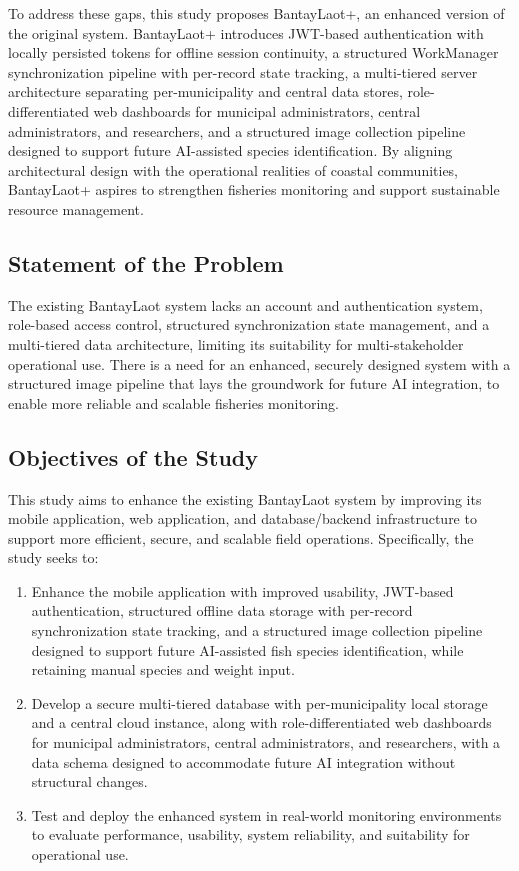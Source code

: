 \documentclass{icsthesis}
\begin{document}
\begin{mainmatter}
To address these gaps, this study proposes BantayLaot+, an enhanced version of the original system. BantayLaot+ introduces JWT-based authentication with locally persisted tokens for offline session continuity, a structured WorkManager synchronization pipeline with per-record state tracking, a multi-tiered server architecture separating per-municipality and central data stores, role-differentiated web dashboards for municipal administrators, central administrators, and researchers, and a structured image collection pipeline designed to support future AI-assisted species identification. By aligning architectural design with the operational realities of coastal communities, BantayLaot+ aspires to strengthen fisheries monitoring and support sustainable resource management.

\subsection{Statement of the Problem}

The existing BantayLaot system lacks an account and authentication system, role-based access control, structured synchronization state management, and a multi-tiered data architecture, limiting its suitability for multi-stakeholder operational use. There is a need for an enhanced, securely designed system with a structured image pipeline that lays the groundwork for future AI integration, to enable more reliable and scalable fisheries monitoring.

\subsection{Objectives of the Study}

This study aims to enhance the existing BantayLaot system by improving its mobile application, web application, and database/backend infrastructure to support more efficient, secure, and scalable field operations. Specifically, the study seeks to:

\begin{enumerate}
\item Enhance the mobile application with improved usability, JWT-based authentication, structured offline data storage with per-record synchronization state tracking, and a structured image collection pipeline designed to support future AI-assisted fish species identification, while retaining manual species and weight input.
\item Develop a secure multi-tiered database with per-municipality local storage and a central cloud instance, along with role-differentiated web dashboards for municipal administrators, central administrators, and researchers, with a data schema designed to accommodate future AI integration without structural changes.
\item Test and deploy the enhanced system in real-world monitoring environments to evaluate performance, usability, system reliability, and suitability for operational use.
\end{enumerate}


\end{mainmatter}
\end{document}
